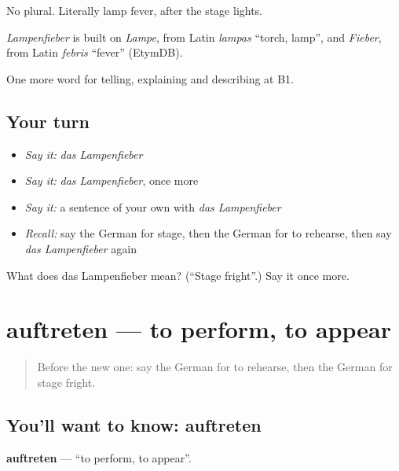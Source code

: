 No plural. Literally lamp fever, after the stage lights.

\begin{cousinweb}
\emph{Lampenfieber} is built on \emph{Lampe}, from Latin \emph{lampas} \textquotedblleft{}torch, lamp\textquotedblright{}, and \emph{Fieber}, from Latin \emph{febris} \textquotedblleft{}fever\textquotedblright{} (EtymDB).
\end{cousinweb}

\begin{grammarlens}[title={What you've built}]
One more word for telling, explaining and describing at B1.
\end{grammarlens}

\subsection*{Your turn}
\begin{itemize}
\raggedright
  \item \emph{Say it:} \emph{das Lampenfieber}
  \item \emph{Say it:} \emph{das Lampenfieber}, once more
  \item \emph{Say it:} a sentence of your own with \emph{das Lampenfieber}
  \item \emph{Recall:} say the German for stage, then the German for to rehearse, then say \emph{das Lampenfieber} again
\end{itemize}

\begin{tcolorbox}[breakable,colback=teal!4,colframe=teal!35!black,title={Before you move on}]
What does das Lampenfieber mean? (\textquotedblleft{}Stage fright\textquotedblright{}.) Say it once more.
\end{tcolorbox}
\section[auftreten]{auftreten — to perform, to appear}

\label{lesson:GE-C516-auftreten}



\begin{quote}
Before the new one: say the German for to rehearse, then the German for stage fright.
\end{quote}

\subsection*{You'll want to know: auftreten}
\textbf{auftreten} — \textquotedblleft{}to perform, to appear\textquotedblright{}.

